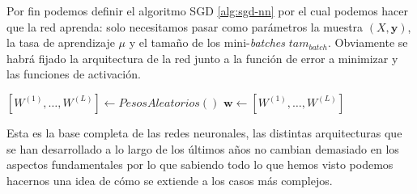 Por fin podemos definir el algoritmo SGD \autoref{alg:sgd-nn} por el cual podemos hacer que la red aprenda: solo necesitamos pasar como parámetros la muestra $(X, \textbf{y})$, la tasa de aprendizaje $\mu$ y el tamaño de los mini-\emph{batches} $tam_{batch}$. Obviamente se habrá fijado la arquitectura de la red junto a la función de error a minimizar y las funciones de activación.

\begin{algorithm}[htbp]
\SetAlgoLined
  $\left[ W^{(1)}, \ldots, W^{(L)}\right] \gets PesosAleatorios()$\;
 $\textbf{w} \gets \left[ W^{(1)}, \ldots, W^{(L)}\right]$\;
 \caption{$AprendizajeRed(X, \textbf{y}, \mu, tam_{batch})$}
 \label{alg:sgd-nn}
\end{algorithm}

Esta es la base completa de las redes neuronales, las distintas arquitecturas que se han desarrollado a lo largo de los últimos años no cambian demasiado en los aspectos fundamentales por lo que sabiendo todo lo que hemos visto podemos hacernos una idea de cómo se extiende a los casos más complejos.


